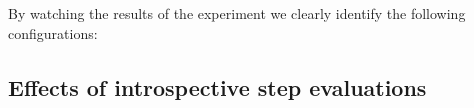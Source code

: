 By watching the results of the experiment we clearly identify the following configurations:



\subsection{Effects of introspective step evaluations}


